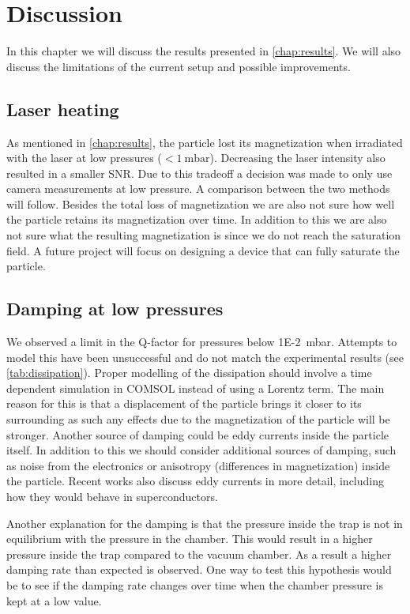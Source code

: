 \chapter{Discussion}
\label{chap:discussion}
In this chapter we will discuss the results presented in \autoref{chap:results}. We will also discuss the limitations of the current setup and possible improvements.

\section*{Laser heating}
As mentioned in \autoref{chap:results}, the particle lost its magnetization when irradiated with the laser at low pressures ($<\qty{1}{\milli\bar}$). Decreasing the laser intensity also resulted in a smaller SNR. Due to this tradeoff a decision was made to only use camera measurements at low pressure. A comparison between the two methods will follow. Besides the total loss of magnetization we are also not sure how well the particle retains its magnetization over time. In addition to this we are also not sure what the resulting magnetization is since we do not reach the saturation field. A future project will focus on designing a device that can fully saturate the particle.

\section*{Damping at low pressures}
We observed a limit in the Q-factor for pressures below \qty{1E-2}{\milli\bar}. Attempts to model this have been unsuccessful and do not match the experimental results (see \autoref{tab:dissipation}). Proper modelling of the dissipation should involve a time dependent simulation in COMSOL instead of using a Lorentz term. The main reason for this is that a displacement of the particle brings it closer to its surrounding as such any effects due to the magnetization of the particle will be stronger. Another source of damping could be eddy currents inside the particle itself. In addition to this we should consider additional sources of damping, such as noise from the electronics or anisotropy (differences in magnetization) inside the particle\cite{millen}. Recent works also discuss eddy currents in more detail, including how they would behave in superconductors\cite{fuwa_stable_2023,gutierrez_latorre_chip_2023}.

Another explanation for the damping is that the pressure inside the trap is not in equilibrium with the pressure in the chamber. This would result in a higher pressure inside the trap compared to the vacuum chamber. As a result a higher damping rate than expected is observed. One way to test this hypothesis would be to see if the damping rate changes over time when the chamber pressure is kept at a low value.

